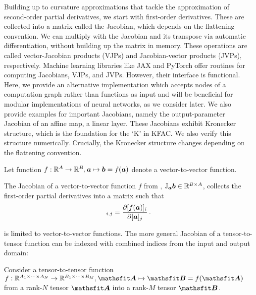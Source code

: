 Building up to curvature approximations that tackle the approximation of second-order partial derivatives, we start with first-order derivatives.
These are collected into a matrix called the Jacobian, which depends on the flattening convention.
We can multiply with the Jacobian and its transpose via automatic differentiation, without building up the matrix in memory.
These operations are called vector-Jacobian products (VJPs) and Jacobian-vector products (JVPs), respectively.
Machine learning libraries like JAX and PyTorch offer routines for computing Jacobians, VJPs, and JVPs.
However, their interface is functional.
Here, we provide an alternative implementation which accepts nodes of a computation graph rather than functions as input and will be beneficial for modular implementations of neural networks, as we consider later.
We also provide examples for important Jacobians, namely the output-parameter Jacobian of an affine map, \ie  a linear layer.
These Jacobians exhibit Kronecker structure, which is the foundation for the `K' in KFAC.
We also verify this structure numerically.
Crucially, the Kronecker structure changes depending on the flattening convention.

\begin{setup}\label{setup:vector_to_vector_function}
  Let function $f: {\mathbb{R}}^A \to {\mathbb{R}}^B, {\bm{a}} \mapsto {\bm{b}} = f({\bm{a}})$ denote a vector-to-vector function.
\end{setup}

\begin{definition}\label{def:vector_jacobian}
  The Jacobian of a vector-to-vector function $f$ from , $\mathrm{J}_{{\bm{a}}}{\bm{b}} \in {\mathbb{R}}^{B \times A}$, collects the first-order partial derivatives into a matrix such that
  \begin{align*}
    [\jac_{\va} \vb]_{i,j} = \frac{\partial [f(\va)]_i}{\partial [\va]_j}\,.
  \end{align*}
\end{definition}
 is limited to vector-to-vector functions.
The more general Jacobian of a tensor-to-tensor function can be indexed with combined indices from the input and output domain:

\begin{setup}\label{setup:jacobians}
  Consider a tensor-to-tensor function $f: \sR^{A_1 \times \dots \times A_N} \to \sR^{B_1 \times \dots \times B_M}, \tA \mapsto \tB = f(\tA)$ from a rank-$N$ tensor $\tA$ into a rank-$M$ tensor $\tB$.
\end{setup}

